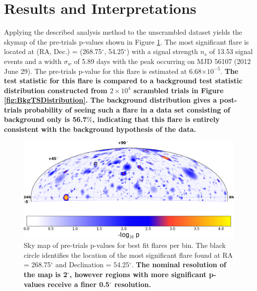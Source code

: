 \documentclass[manuscript]{aastex}
\begin{document}
\section{Results and Interpretations}
Applying the described analysis method to the unscrambled dataset yields the skymap of the pre-trials p-values shown in Figure \ref{fig:RealSkyMap}. The most significant flare is located at (RA, Dec.) = (268.75$^{\circ}$, 54.25$^{\circ}$) with a signal strength $n_s$ of 13.53 signal events and a width $\sigma_w$ of 5.89 days with the peak occurring on MJD 56107 (2012 June 29). The pre-trials p-value for this flare is estimated at 6.68$\times 10^{-5}$. \textbf{The test statistic for this flare is compared to a background test statistic distribution constructed from $2 \times 10^4$ scrambled trials in Figure \ref{fig:BkgTSDistribution}. The background distribution gives a post-trials probability of seeing such a flare in a data set consisting of background only is 56.7$\%$, indicating that this flare is entirely consistent with the background hypothesis of the data.}
\begin{figure}[ht]
  \begin{center}
    \includegraphics[width=1.0\textwidth,keepaspectratio]{plots/RealMapFine_BigSpot_Cut.png}
  \end{center}
  \caption[Results Sky Map]{Sky map of pre-trials p-values for best fit flares per bin. The black circle identifies the location of the most significant flare found at RA = 268.75$^\circ$ and Declination = 54.25$^\circ$. \textbf{The nominal resolution of the map is 2$^{\circ}$, however regions with more significant p-values receive a finer 0.5$^{\circ}$ resolution.}}
  \label{fig:RealSkyMap}
\end{figure}
\end{document}
